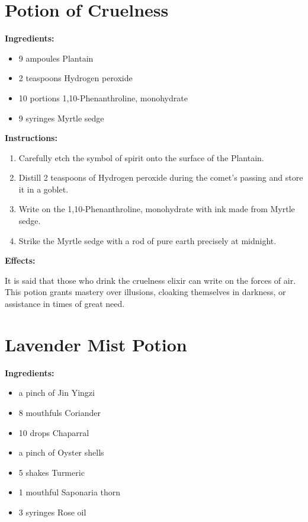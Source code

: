\documentclass{article}
\begin{document}
\newpage
\section*{Potion of Cruelness}

\textbf{Ingredients:}

\begin{itemize}
  \item 9 ampoules Plantain
  \item 2 teaspoons Hydrogen peroxide
  \item 10 portions 1,10-Phenanthroline, monohydrate
  \item 9 syringes Myrtle sedge
\end{itemize}

\textbf{Instructions:}

\begin{enumerate}
  \item Carefully etch the symbol of spirit onto the surface of the Plantain.
  \item Distill 2 teaspoons of Hydrogen peroxide during the comet’s passing and store it in a goblet.
  \item Write on the 1,10-Phenanthroline, monohydrate with ink made from Myrtle sedge.
  \item Strike the Myrtle sedge with a rod of pure earth precisely at midnight.
\end{enumerate}

\textbf{Effects:}

It is said that those who drink the cruelness elixir can write on the forces of air. This potion grants mastery over illusions, cloaking themselves in darkness, or assistance in times of great need.

\newpage
\section*{Lavender Mist Potion}

\textbf{Ingredients:}

\begin{itemize}
  \item a pinch of Jin Yingzi
  \item 8 mouthfuls Coriander
  \item 10 drops Chaparral
  \item a pinch of Oyster shells
  \item 5 shakes Turmeric
  \item 1 mouthful Saponaria thorn
  \item 3 syringes Rose oil
\end{itemize}
\end{document}
